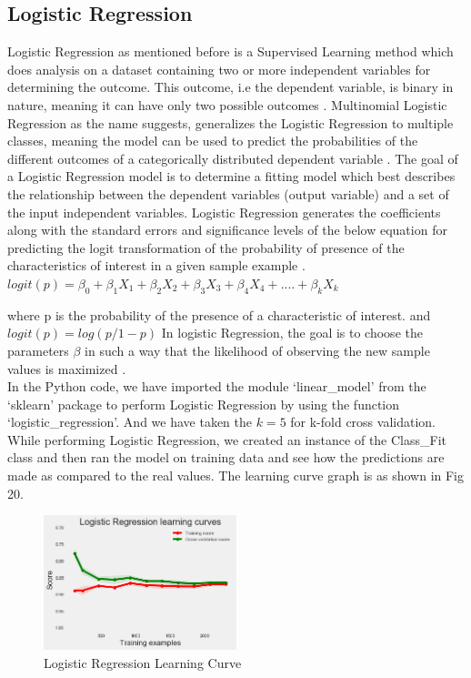 \subsection{Logistic Regression}
Logistic Regression as mentioned before is a Supervised Learning method which does analysis on a dataset containing two or more independent variables for determining the outcome. This outcome, i.e the dependent variable, is binary in nature, meaning it can have only two possible outcomes \cite{link10}. Multinomial Logistic Regression as the name suggests, generalizes the Logistic Regression to multiple classes, meaning the model can be used to predict the probabilities of the different outcomes of a categorically distributed dependent variable \cite{link111}. The goal of a Logistic Regression model is to determine a fitting model which best describes the relationship between the dependent variables (output variable) and a set of the input independent variables. Logistic Regression generates the coefficients along with the standard errors and significance levels of the below equation for predicting the logit transformation of the probability of presence of the characteristics of interest in a given sample example \cite{link10}. \\

$logit(p) = \beta_0 + \beta_1X_1 + \beta_2X_2 +\beta_3X_3 + \beta_4X_4 + .... + \beta_kX_k$

where p is the probability of the presence of a characteristic of interest.
and $logit(p) = log(p/1-p)$
In logistic Regression, the goal is to choose the parameters $\beta$ in such a way that the likelihood of observing the new sample values is maximized \cite{link10}.\\
In the Python code, we have imported the module `linear\_model' from the `sklearn' package to perform Logistic Regression by using the function `logistic\_regression'. And we have taken the $k=5$ for k-fold cross validation. While performing Logistic Regression, we created an instance of the Class\_Fit class and then ran the model on training data and see how the predictions are made as compared to the real values. The learning curve graph is as shown in Fig 20.

\begin{figure}[H]
\caption{Logistic Regression Learning Curve}
\label{5.1}
\centering
\includegraphics[width=0.5\textwidth]{images/5_1.png}
\end{figure}

